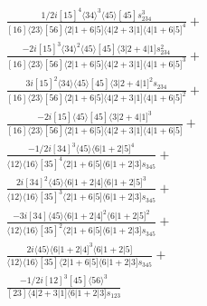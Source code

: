 \documentclass[varwidth, border=5pt]{standalone}
\begin{document}
\begin{my}
$\begin{gathered}
\scriptscriptstyle\frac{1/2i[15]^4⟨34⟩^3⟨45⟩[45]s_{234}^3}{[16]⟨23⟩[56]⟨2|1+6|5]⟨4|2+3|1]⟨4|1+6|5]^4}+\\
\scriptscriptstyle\frac{-2i[15]^3⟨34⟩^2⟨45⟩[45]⟨3|2+4|1]s_{234}^2}{[16]⟨23⟩[56]⟨2|1+6|5]⟨4|2+3|1]⟨4|1+6|5]^3}+\\
\scriptscriptstyle\frac{3i[15]^2⟨34⟩⟨45⟩[45]⟨3|2+4|1]^2s_{234}}{[16]⟨23⟩[56]⟨2|1+6|5]⟨4|2+3|1]⟨4|1+6|5]^2}+\\
\scriptscriptstyle\frac{-2i[15]⟨45⟩[45]⟨3|2+4|1]^3}{[16]⟨23⟩[56]⟨2|1+6|5]⟨4|2+3|1]⟨4|1+6|5]}+\\
\scriptscriptstyle\frac{-1/2i[34]^3⟨45⟩⟨6|1+2|5]^4}{⟨12⟩⟨16⟩[35]^4⟨2|1+6|5]⟨6|1+2|3]s_{345}}+\\
\scriptscriptstyle\frac{2i[34]^2⟨45⟩⟨6|1+2|4]⟨6|1+2|5]^3}{⟨12⟩⟨16⟩[35]^3⟨2|1+6|5]⟨6|1+2|3]s_{345}}+\\
\scriptscriptstyle\frac{-3i[34]⟨45⟩⟨6|1+2|4]^2⟨6|1+2|5]^2}{⟨12⟩⟨16⟩[35]^2⟨2|1+6|5]⟨6|1+2|3]s_{345}}+\\
\scriptscriptstyle\frac{2i⟨45⟩⟨6|1+2|4]^3⟨6|1+2|5]}{⟨12⟩⟨16⟩[35]⟨2|1+6|5]⟨6|1+2|3]s_{345}}+\\
\scriptscriptstyle\frac{-1/2i[12]^3[45]⟨56⟩^3}{[23]⟨4|2+3|1]⟨6|1+2|3]s_{123}}\phantom{+}
\end{gathered}$
\end{my}
\end{document}
